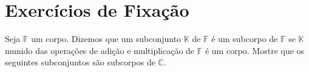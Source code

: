 
\chapter{Exercícios de Fixação}

\begin{questions}
  \question\label{exercício:1}

  Seja $\mathbb{F}$ um corpo.
  Dizemos que um subconjunto $\mathbb{K}$ de $\mathbb{F}$ é um
  subcorpo de $\mathbb{F}$ se $\mathbb{K}$ munido das operações de
  adição e multiplicação de $\mathbb{F}$ é um corpo.
  Mostre que os seguintes subconjuntos são subcorpos de $\mathbb{C}$.

  \begin{parts}
  \end{parts}

  \begin{solutionordottedlines}
    \begin{parts}

\end{parts}
\end{solutionordottedlines}
\end{questions}
